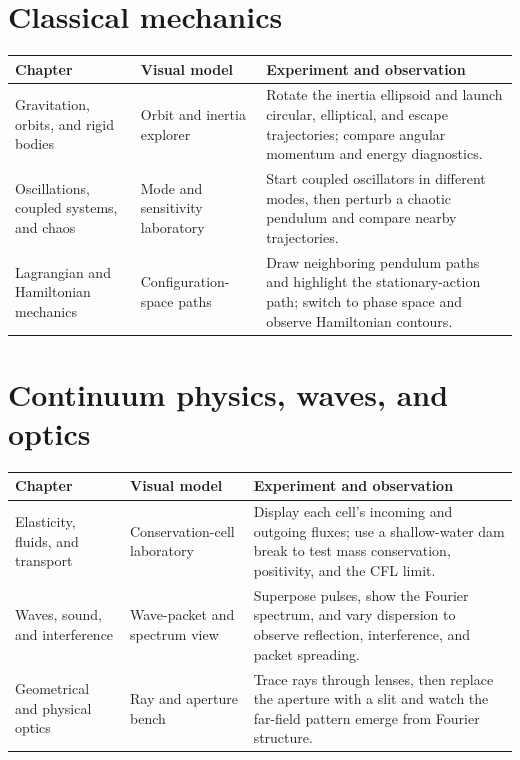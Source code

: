 \documentclass[11pt,oneside]{book}
\theoremstyle{reviewstyle}
\begin{document}
\section{Classical mechanics}
\begin{longtable}{p{}p{}p{}}
\toprule Chapter & Visual model & Experiment and observation\\ \midrule
\endhead
Gravitation, orbits, and rigid bodies & Orbit and inertia explorer & Rotate the inertia ellipsoid and launch circular, elliptical, and escape trajectories; compare angular momentum and energy diagnostics.\\
Oscillations, coupled systems, and chaos & Mode and sensitivity laboratory & Start coupled oscillators in different modes, then perturb a chaotic pendulum and compare nearby trajectories.\\
Lagrangian and Hamiltonian mechanics & Configuration-space paths & Draw neighboring pendulum paths and highlight the stationary-action path; switch to phase space and observe Hamiltonian contours.\\
\bottomrule
\end{longtable}

\section{Continuum physics, waves, and optics}
\begin{longtable}{p{}p{}p{}}
\toprule Chapter & Visual model & Experiment and observation\\ \midrule
\endhead
Elasticity, fluids, and transport & Conservation-cell laboratory & Display each cell's incoming and outgoing fluxes; use a shallow-water dam break to test mass conservation, positivity, and the CFL limit.\\
Waves, sound, and interference & Wave-packet and spectrum view & Superpose pulses, show the Fourier spectrum, and vary dispersion to observe reflection, interference, and packet spreading.\\
Geometrical and physical optics & Ray and aperture bench & Trace rays through lenses, then replace the aperture with a slit and watch the far-field pattern emerge from Fourier structure.\\
\bottomrule
\end{longtable}
\end{document}
